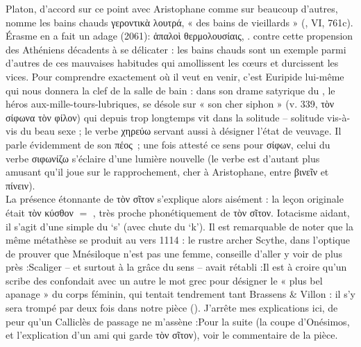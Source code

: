 {{Platon, d'accord sur ce point avec Aristophane comme sur beaucoup d'autres, nomme les bains chauds γεροντικὰ λουτρά, « des bains de vieillards » (, VI, 761c). Érasme en a fait un adage (2061): ἁπαλοὶ θερμολουσίαις, .} contre cette propension des Athéniens décadents à se délicater : les bains chauds sont un exemple parmi d'autres de ces mauvaises habitudes qui amollissent les cœurs et durcissent les vices. Pour comprendre exactement où il veut en venir, c'est Euripide lui-même qui nous donnera la clef de la salle de bain : dans son drame satyrique du , le héros aux-mille-tours-lubriques, se désole sur « son cher siphon » (v. 339, τὸν σίφωνα τὸν φίλον) qui depuis trop longtemps vit dans la solitude – solitude vis-à-vis du beau sexe ; le verbe χηρεύω servant aussi à désigner l'état de veuvage. Il parle évidemment de son πέος~; une fois attesté ce sens pour σίφων, celui du verbe σιφωνίζω s'éclaire d'une lumière nouvelle (le verbe est d'autant plus amusant qu'il joue sur le rapprochement, cher à Aristophane, entre βινεῖν et πίνειν).\\
La présence étonnante de τὸν σῖτον s'explique alors aisément : la leçon originale était τὸν κύσθον $=$ , très proche phonétiquement de τὸν σῖτον. 
Iotacisme aidant, il s'agit d'une simple  du `s' (avec chute du `k').
Il est remarquable de noter que la même métathèse se produit au vers 1114 : le rustre archer Scythe, dans l'optique de prouver que Mnésiloque n'est pas une femme, conseille d'aller y voir de plus près :Scaliger  -- et surtout à la grâce du sens -- avait rétabli :Il est à croire qu'un scribe des  confondait avec un autre le mot grec pour désigner le « plus bel apanage » du corps féminin, qui tentait tendrement tant Brassens \& Villon : il s'y sera trompé par deux fois dans notre pièce ().
J'arrête mes explications ici, de peur qu'un Calliclès de passage ne m'assène :Pour la suite (la coupe d'Onésimos, et l'explication d'un ami qui garde τὸν σῖτον), voir le commentaire de la pièce.}

